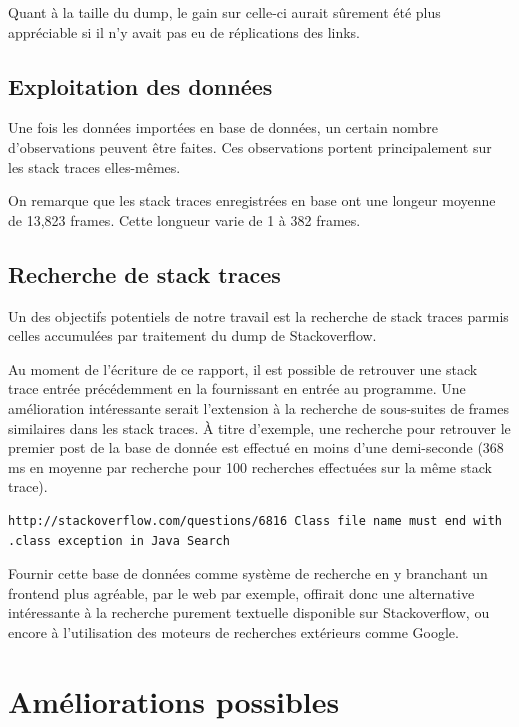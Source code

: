 \documentclass[11pt,a4paper]{article}
\begin{document}
Quant à la taille du dump, le gain sur celle-ci aurait sûrement été plus appréciable si il n'y avait pas eu de réplications des links.
\newline
 

\subsection{Exploitation des données}
Une fois les données importées en base de données, un certain nombre d'observations peuvent être faites.
Ces observations portent principalement sur les stack traces elles-mêmes.

On remarque que les stack traces enregistrées en base ont une longeur moyenne de 13,823 frames.
Cette longueur varie de 1 à 382 frames.

\subsection{Recherche de stack traces}
Un des objectifs potentiels de notre travail est la recherche de stack traces parmis celles accumulées par traitement du dump de Stackoverflow.

Au moment de l'écriture de ce rapport, il est possible de retrouver une stack trace entrée précédemment en la fournissant en entrée au programme.
Une amélioration intéressante serait l'extension à la recherche de sous-suites de frames similaires dans les stack traces.
À titre d'exemple, une recherche pour retrouver le premier post de la base de donnée est effectué en moins d'une demi-seconde (368 ms  en moyenne par recherche pour 100 recherches effectuées sur la même stack trace).

\begin{lstlisting}[caption=Sortie du programme de recherche dans les posts, breaklines=true,frame = single]
http://stackoverflow.com/questions/6816	Class file name must end with .class exception in Java Search
\end{lstlisting}

Fournir cette base de données comme système de recherche en y branchant un frontend plus agréable, par le web par exemple, offirait donc une alternative intéressante à la recherche purement textuelle disponible sur Stackoverflow, ou encore à l'utilisation des moteurs de recherches extérieurs comme Google.

\section{Améliorations possibles}
\end{document}
